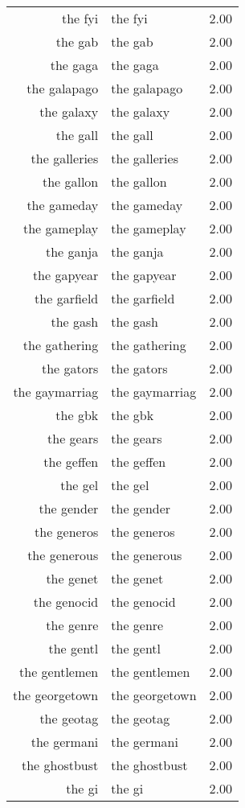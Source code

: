 \begin{table}[ht]
\begin{tabular}{rlr}
  the fyi & the fyi & 2.00 \\ 
  the gab & the gab & 2.00 \\ 
  the gaga & the gaga & 2.00 \\ 
  the galapago & the galapago & 2.00 \\ 
  the galaxy & the galaxy & 2.00 \\ 
  the gall & the gall & 2.00 \\ 
  the galleries & the galleries & 2.00 \\ 
  the gallon & the gallon & 2.00 \\ 
  the gameday & the gameday & 2.00 \\ 
  the gameplay & the gameplay & 2.00 \\ 
  the ganja & the ganja & 2.00 \\ 
  the gapyear & the gapyear & 2.00 \\ 
  the garfield & the garfield & 2.00 \\ 
  the gash & the gash & 2.00 \\ 
  the gathering & the gathering & 2.00 \\ 
  the gators & the gators & 2.00 \\ 
  the gaymarriag & the gaymarriag & 2.00 \\ 
  the gbk & the gbk & 2.00 \\ 
  the gears & the gears & 2.00 \\ 
  the geffen & the geffen & 2.00 \\ 
  the gel & the gel & 2.00 \\ 
  the gender & the gender & 2.00 \\ 
  the generos & the generos & 2.00 \\ 
  the generous & the generous & 2.00 \\ 
  the genet & the genet & 2.00 \\ 
  the genocid & the genocid & 2.00 \\ 
  the genre & the genre & 2.00 \\ 
  the gentl & the gentl & 2.00 \\ 
  the gentlemen & the gentlemen & 2.00 \\ 
  the georgetown & the georgetown & 2.00 \\ 
  the geotag & the geotag & 2.00 \\ 
  the germani & the germani & 2.00 \\ 
  the ghostbust & the ghostbust & 2.00 \\ 
  the gi & the gi & 2.00 \\ 

\end{tabular}
\end{table}
